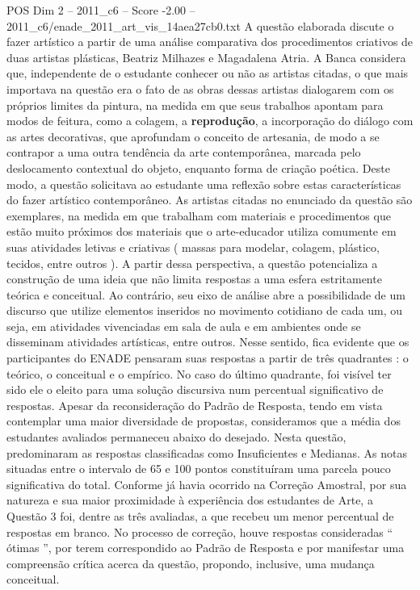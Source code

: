 \begin{textsample}{POS Dim 2 – 2011\_c6 – Score -2.00 – 2011\_c6/enade\_2011\_art\_vis\_14aea27cb0.txt}
A questão elaborada discute o fazer artístico a partir de uma análise comparativa dos procedimentos criativos de duas artistas plásticas, Beatriz Milhazes e Magadalena Atria.
A Banca considera que, independente de o estudante conhecer ou não as artistas citadas, o que mais importava na questão era o fato de as obras dessas artistas dialogarem com os próprios limites da pintura, na medida em que seus trabalhos apontam para modos de feitura, como a colagem, a \textbf{reprodução}, a incorporação do diálogo com as artes decorativas, que aprofundam o conceito de artesania, de modo a se contrapor a uma outra tendência da arte contemporânea, marcada pelo deslocamento contextual do objeto, enquanto forma de criação poética.
Deste modo, a questão solicitava ao estudante uma reflexão sobre estas características do fazer artístico contemporâneo.
As artistas citadas no enunciado da questão são exemplares, na medida em que trabalham com materiais e procedimentos que estão muito próximos dos materiais que o arte-educador utiliza comumente em suas atividades letivas e criativas ( massas para modelar, colagem, plástico, tecidos, entre outros ).
A partir dessa perspectiva, a questão potencializa a construção de uma ideia que não limita respostas a uma esfera estritamente teórica e conceitual.
Ao contrário, seu eixo de análise abre a possibilidade de um discurso que utilize elementos inseridos no movimento cotidiano de cada um, ou seja, em atividades vivenciadas em sala de aula e em ambientes onde se disseminam atividades artísticas, entre outros.
Nesse sentido, fica evidente que os participantes do ENADE pensaram suas respostas a partir de três quadrantes : o teórico, o conceitual e o empírico.
No caso do último quadrante, foi visível ter sido ele o eleito para uma solução discursiva num percentual significativo de respostas.
Apesar da reconsideração do Padrão de Resposta, tendo em vista contemplar uma maior diversidade de propostas, consideramos que a média dos estudantes avaliados permaneceu abaixo do desejado.
Nesta questão, predominaram as respostas classificadas como Insuficientes e Medianas.
As notas situadas entre o intervalo de 65 e 100 pontos constituíram uma parcela pouco significativa do total.
Conforme já havia ocorrido na Correção Amostral, por sua natureza e sua maior proximidade à experiência dos estudantes de Arte, a Questão 3 foi, dentre as três avaliadas, a que recebeu um menor percentual de respostas em branco.
No processo de correção, houve respostas consideradas “ ótimas ”, por terem correspondido ao Padrão de Resposta e por manifestar uma compreensão crítica acerca da questão, propondo, inclusive, uma mudança conceitual.

\end{textsample}

